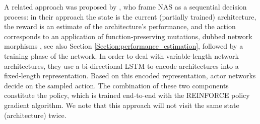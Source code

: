 \documentclass[twoside,11pt]{article}
\renewcommand{\cite}[1]{\citep{#1}}
\newcommand{\note}[1]{
	\noindent~\\
	\vspace{0.25cm}
	\fcolorbox{red}{yellow}{\parbox{0.97\textwidth}{#1\\}}
	\vspace{0.25cm}
}
\begin{document}
A related approach was proposed by \citet{cai2017reinforcement}, who frame NAS as a sequential decision process: in their approach the state is the current (partially trained) architecture, the reward is an estimate of the architecture's performance, and the action corresponds to an application of function-preserving mutations, dubbed network morphisms \cite{DBLP:journals/corr/ChenGS15, DBLP:journals/corr/WeiWC17}, see also Section \ref{Section:performance_estimation}, followed by a training phase of the network. 
In order to deal with variable-length network architectures, they use a bi-directional LSTM to encode architectures into a fixed-length representation. Based on this encoded representation, actor networks decide on the sampled action. The combination of these two components constitute the policy, which is trained end-to-end with the REINFORCE policy gradient algorithm. We note that this approach will not visit the same state (architecture) twice.%

\end{document}
